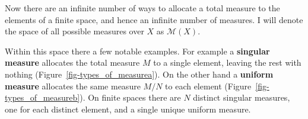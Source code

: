 \documentclass[
  letterpaper,
  DIV=11,
  numbers=noendperiod]{scrartcl}
\begin{document}
Now there are an infinite number of ways to allocate a total measure to
the elements of a finite space, and hence an infinite number of
measures. I will denote the space of all possible measures over \(X\) as
\(\mathcal{M}(X)\).

Within this space there a few notable examples. For example a
\textbf{singular measure} allocates the total measure \(M\) to a single
element, leaving the rest with nothing
(Figure~\ref{fig-types_of_measurea}). On the other hand a
\textbf{uniform measure} allocates the same measure \(M / N\) to each
element (Figure~\ref{fig-types_of_measureb}). On finite spaces there are
\(N\) distinct singular measures, one for each distinct element, and a
single unique uniform measure.

\begin{figure}

\begin{minipage}[t]{0.50\linewidth}

{\centering 


}

\subcaption{\label{fig-types_of_measurea}}
\end{minipage}%
%
\begin{minipage}[t]{0.50\linewidth}

{\centering 

\raisebox{-\height}{

}}
\end{minipage}
\end{figure}
\end{document}
